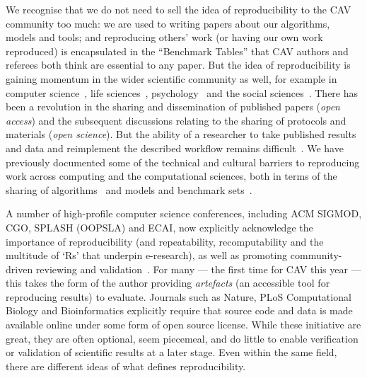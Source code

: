 \documentclass{llncs}
\begin{document}
We recognise that we do not need to sell the idea of reproducibility
to the CAV community too much: we are used to writing papers about our
algorithms, models and tools; and reproducing others' work (or having
our own work reproduced) is encapsulated in the ``Benchmark Tables''
that CAV authors and referees both think are essential to any
paper. But the idea of reproducibility is gaining momentum in the wider
scientific community as well, for example in computer
science~\cite{collberg-et-al:2014}, life
sciences~\cite{rollins-et-al:2014},
psychology~\cite{chambers-et-al:2014} and the social
sciences~\cite{conte-et-al:2012}.  There has been a revolution in the
sharing and dissemination of published papers (\emph{open access}) and
the subsequent discussions relating to the sharing of protocols and
materials (\emph{open science}). But the ability of a researcher to
take published results and data and reimplement the described workflow
remains
difficult~\cite{peng:2011,sandve-et-al:2013,wilson-et-al:2014}.  
We have
previously documented some of the technical and cultural barriers to
reproducing work across computing and the computational sciences, both
in terms of the sharing of algorithms~\cite{crick-et-al_recomp2014}
and models and benchmark sets~\cite{crick-et-al_wssspe2}.


A number of high-profile computer science conferences, including ACM
SIGMOD, CGO, SPLASH (OOPSLA) and ECAI, now explicitly acknowledge the
importance of reproducibility (and repeatability, recomputability and
the multitude of `Rs' that underpin e-research), as well as promoting
community-driven reviewing and validation~\cite{fursin+dubach:2014}.
For many --- the first time for CAV this year --- this takes the form
of the author providing \emph{artefacts} (an accessible tool for
reproducing results) to evaluate. Journals such as Nature, PLoS
Computational Biology and Bioinformatics explicitly require that
source code and data is made available online under some form of open
source license. While these initiative are great, they are often
optional, seem piecemeal, and do little to enable verification or
validation of scientific results at a later stage. Even within the
same field, there are different ideas of what defines reproducibility.
\end{document}
